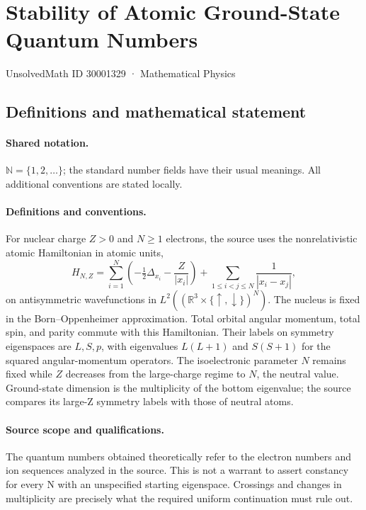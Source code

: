 \documentclass[11pt]{article}
\begin{document}
\setcounter{section}{30001328}
\section{Stability of Atomic Ground-State Quantum Numbers}\label{30001329}
{\small UnsolvedMath ID 30001329 · Mathematical Physics}
\subsection{Definitions and mathematical statement}

\paragraph{Shared notation.}$\mathbb N=\{1,2,\ldots\}$; the standard number fields have their usual meanings. All additional conventions are stated locally.


\paragraph{Definitions and conventions.} For nuclear charge $Z>0$ and $N\ge1$ electrons, the source uses the nonrelativistic atomic Hamiltonian in atomic units,
\[
H_{N,Z}=\sum_{i=1}^N\left(-\tfrac12\Delta_{x_i}-\frac{Z}{|x_i|}\right)+
\sum_{1\le i<j\le N}\frac1{|x_i-x_j|},
\]
on antisymmetric wavefunctions in $L^2((\mathbb R^3\times\{\uparrow,\downarrow\})^N)$. The nucleus is fixed in the Born--Oppenheimer approximation. Total orbital angular momentum, total spin, and parity commute with this Hamiltonian. Their labels on symmetry eigenspaces are $L,S,p$, with eigenvalues $L(L+1)$ and $S(S+1)$ for the squared angular-momentum operators. The isoelectronic parameter $N$ remains fixed while $Z$ decreases from the large-charge regime to $N$, the neutral value. Ground-state dimension is the multiplicity of the bottom eigenvalue; the source compares its large-Z symmetry labels with those of neutral atoms.

\paragraph{Source scope and qualifications.} The quantum numbers obtained theoretically refer to the electron numbers and ion sequences analyzed in the source. This is not a warrant to assert constancy for every N with an unspecified starting eigenspace. Crossings and changes in multiplicity are precisely what the required uniform continuation must rule out.
\end{document}
